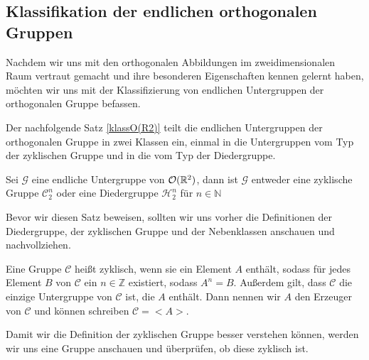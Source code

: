 \subsection{Klassifikation der endlichen orthogonalen Gruppen}
Nachdem wir uns mit den orthogonalen Abbildungen im zweidimensionalen Raum vertraut gemacht und ihre besonderen Eigenschaften kennen gelernt haben, möchten wir uns mit der Klassifizierung von endlichen Untergruppen der orthogonalen Gruppe befassen. 

Der nachfolgende Satz \ref{klassO(R2)} teilt die endlichen Untergruppen der orthogonalen Gruppe in zwei Klassen ein, einmal in die Untergruppen vom Typ der zyklischen Gruppe und in die vom Typ der Diedergruppe.
\begin{theorem}\label{klassO(R2)}
	Sei $\mathcal{G}$ eine endliche Untergruppe von ${\mathcal{O}(\mathbb{R}^2)}$, dann ist $\mathcal{G}$ entweder eine zyklische Gruppe $\mathcal{C}^n_2$ oder eine Diedergruppe $\mathcal{H}^n_2$ für $n \in \mathbb{N}$
\end{theorem}
Bevor wir diesen Satz beweisen, sollten wir uns vorher die Definitionen der Diedergruppe, der zyklischen Gruppe und der Nebenklassen anschauen und nachvollziehen.
\begin{defi}
	Eine Gruppe $\mathcal{C}$ heißt zyklisch, wenn sie ein Element $A$ enthält, sodass für jedes Element $B$ von $\mathcal{C}$ ein $n \in \mathbb{Z}$ existiert, sodass $A^n = B$. Außerdem gilt, dass $\mathcal{C}$ die einzige Untergruppe von $\mathcal{C}$ ist, die $A$ enthält. Dann nennen wir $A$ den Erzeuger von $\mathcal{C}$ und können schreiben $\mathcal{C} = <A>$.
\end{defi}
Damit wir die Definition der zyklischen Gruppe besser verstehen können, werden wir uns eine Gruppe anschauen und überprüfen, ob diese zyklisch ist. 

